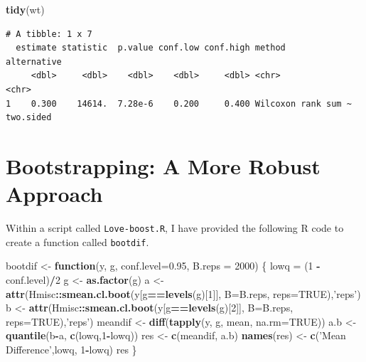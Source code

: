 \documentclass[
]{book}
\newenvironment{Shaded}{\begin{snugshade}}{\end{snugshade}}
\newcommand{\ControlFlowTok}[1]{\textcolor[rgb]{0.13,0.29,0.53}{\textbf{#1}}}
\newcommand{\DataTypeTok}[1]{\textcolor[rgb]{0.13,0.29,0.53}{#1}}
\newcommand{\DecValTok}[1]{\textcolor[rgb]{0.00,0.00,0.81}{#1}}
\newcommand{\FloatTok}[1]{\textcolor[rgb]{0.00,0.00,0.81}{#1}}
\newcommand{\KeywordTok}[1]{\textcolor[rgb]{0.13,0.29,0.53}{\textbf{#1}}}
\newcommand{\NormalTok}[1]{#1}
\newcommand{\OperatorTok}[1]{\textcolor[rgb]{0.81,0.36,0.00}{\textbf{#1}}}
\newcommand{\OtherTok}[1]{\textcolor[rgb]{0.56,0.35,0.01}{#1}}
\newcommand{\StringTok}[1]{\textcolor[rgb]{0.31,0.60,0.02}{#1}}
\begin{document}
\begin{Shaded}
\begin{Highlighting}[]
\KeywordTok{tidy}\NormalTok{(wt)}
\end{Highlighting}
\end{Shaded}

\begin{verbatim}
# A tibble: 1 x 7
  estimate statistic  p.value conf.low conf.high method              alternative
     <dbl>     <dbl>    <dbl>    <dbl>     <dbl> <chr>               <chr>      
1    0.300    14614.  7.28e-6    0.200     0.400 Wilcoxon rank sum ~ two.sided  
\end{verbatim}

\hypertarget{bootstrapping-a-more-robust-approach}{%
\section{Bootstrapping: A More Robust Approach}\label{bootstrapping-a-more-robust-approach}}

Within a script called \texttt{Love-boost.R}, I have provided the following R code to create a function called \texttt{bootdif}.

\begin{Shaded}
\begin{Highlighting}[]
\NormalTok{bootdif <-}
\StringTok{  }\ControlFlowTok{function}\NormalTok{(y, g, }\DataTypeTok{conf.level=}\FloatTok{0.95}\NormalTok{, }\DataTypeTok{B.reps =} \DecValTok{2000}\NormalTok{) \{}
\NormalTok{    lowq =}\StringTok{ }\NormalTok{(}\DecValTok{1} \OperatorTok{-}\StringTok{ }\NormalTok{conf.level)}\OperatorTok{/}\DecValTok{2}
\NormalTok{    g <-}\StringTok{ }\KeywordTok{as.factor}\NormalTok{(g)}
\NormalTok{    a <-}\StringTok{ }\KeywordTok{attr}\NormalTok{(Hmisc}\OperatorTok{::}\KeywordTok{smean.cl.boot}\NormalTok{(y[g}\OperatorTok{==}\KeywordTok{levels}\NormalTok{(g)[}\DecValTok{1}\NormalTok{]], }\DataTypeTok{B=}\NormalTok{B.reps, }\DataTypeTok{reps=}\OtherTok{TRUE}\NormalTok{),}\StringTok{'reps'}\NormalTok{)}
\NormalTok{    b <-}\StringTok{ }\KeywordTok{attr}\NormalTok{(Hmisc}\OperatorTok{::}\KeywordTok{smean.cl.boot}\NormalTok{(y[g}\OperatorTok{==}\KeywordTok{levels}\NormalTok{(g)[}\DecValTok{2}\NormalTok{]], }\DataTypeTok{B=}\NormalTok{B.reps, }\DataTypeTok{reps=}\OtherTok{TRUE}\NormalTok{),}\StringTok{'reps'}\NormalTok{)}
\NormalTok{    meandif <-}\StringTok{ }\KeywordTok{diff}\NormalTok{(}\KeywordTok{tapply}\NormalTok{(y, g, mean, }\DataTypeTok{na.rm=}\OtherTok{TRUE}\NormalTok{))}
\NormalTok{    a.b <-}\StringTok{ }\KeywordTok{quantile}\NormalTok{(b}\OperatorTok{-}\NormalTok{a, }\KeywordTok{c}\NormalTok{(lowq,}\DecValTok{1}\OperatorTok{-}\NormalTok{lowq))}
\NormalTok{    res <-}\StringTok{ }\KeywordTok{c}\NormalTok{(meandif, a.b)}
    \KeywordTok{names}\NormalTok{(res) <-}\StringTok{ }\KeywordTok{c}\NormalTok{(}\StringTok{'Mean Difference'}\NormalTok{,lowq, }\DecValTok{1}\OperatorTok{-}\NormalTok{lowq)}
\NormalTok{    res}
\NormalTok{  \}}
\end{Highlighting}
\end{Shaded}
\end{document}

